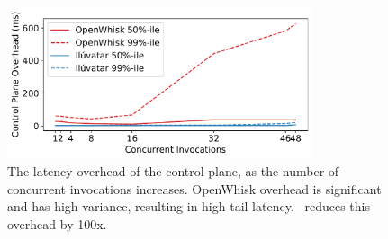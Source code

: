 \begin{figure}
  \centering  \includegraphics[width=0.8\textwidth]{iluvatar/graphs/scaling/pyaes/overhead-scaling.pdf}
  \caption{The latency overhead of the control plane, as the number of concurrent invocations increases. 
        OpenWhisk overhead is significant and has high variance, resulting in high tail latency. 
        \sysname~reduces this overhead by 100x. }
  \label{fig:ow-scaling}
\end{figure}


